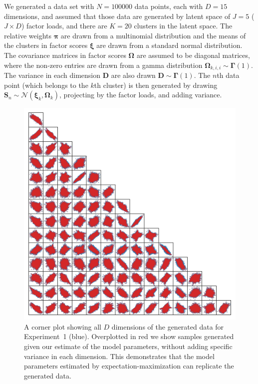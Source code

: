 \documentclass[twocolumn]{aastex61}
\newcommand{\vect}[1]{\boldsymbol{\mathbf{#1}}}
\renewcommand{\vec}[1]{\vect{#1}}
\newcommand{\weight}{\pi}
\newcommand{\factorscores}{\textbf{S}}
\newcommand{\specificvariance}{\vec{D}}
\newcommand{\scoremeans}{\vec\xi}
\newcommand{\scorecovs}{\vec\Omega}
\newcommand{\NumData}{N}
\newcommand{\NumDimensions}{D}
\newcommand{\numdata}{n}
\newcommand{\NumLatentFactors}{J}
\newcommand{\NumComponents}{K}
\newcommand{\numcomponents}{k}
\begin{document}
We generated a data set with ${\NumData = 100000}$ data points, each with
$\NumDimensions = 15$ dimensions, and assumed that those data are generated by
latent space of $\NumLatentFactors = 5$ ($\NumLatentFactors \times \NumDimensions$) factor loads, and there are $\NumComponents = 20$
clusters in the latent space. The relative weights $\vec\weight$
are drawn from a multinomial distribution and the means of the clusters
in factor scores $\scoremeans$ are drawn from a standard normal
distribution. The covariance matrices in factor scores $\scorecovs$ are assumed to be diagonal matrices, where the non-zero entries are drawn from a gamma distribution $\scorecovs_{\numcomponents,i,i} \sim \vec\Gamma\left(1\right)$. The variance in 
each dimension $\specificvariance$ are also drawn $\specificvariance \sim \vec\Gamma\left(1\right)$.
The $\numdata$th data point (which belongs to the $\numcomponents$th cluster) is then
generated by drawing $\factorscores_{\numdata} \sim \mathcal{N}(\scoremeans_\numcomponents,\scorecovs_\numcomponents)$, projecting by the factor loads, and adding variance.



\begin{figure}
	\includegraphics[width=1.0\textwidth]{experiments/toy-model-data.png}
    \caption{A corner plot showing all $\NumDimensions$ dimensions of the
    		 generated data for Experiment~1 (blue). Overplotted in red
		 	 we show samples generated given our estimate of the model 
			 parameters, without adding specific variance in each dimension.
			 This demonstrates that the model parameters estimated by
			 expectation-maximization can replicate the generated data.}
    \label{fig:toy-model-data}
\end{figure}
\end{document}
